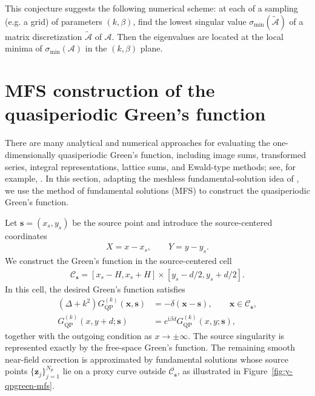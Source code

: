 \documentclass[11pt,fleqn]{article}
\newcommand{\ii}{\mathrm{i}}
\theoremstyle{definition}
\theoremstyle{remark}
\begin{document}
This conjecture suggests the following numerical scheme: at each of a sampling (e.g. a grid) of parameters $(k, \beta)$, find the lowest singular value 
$\sigma_{\min}(\tilde{\mathcal{A}})$ of a matrix discretization $\tilde{\mathcal{A}}$ of $\mathcal{A}$. Then the eigenvalues are located at the local minima of $\sigma_{\min}(\mathcal{A})$ in the $(k, \beta)$ plane.

\section{MFS construction of the quasiperiodic Green's function}
There are many analytical and numerical approaches for evaluating the one-dimensionally
quasiperiodic Green's function, including image sums, transformed series, integral
representations, lattice sums, and Ewald-type methods; see, for example,
\cite{Linton1998}. In this section, adapting the meshless fundamental-solution idea of
\cite{LuanSunZhuang2019}, we use the method of fundamental solutions (MFS) to construct
the quasiperiodic Green's function.

Let $\mathbf{s}=(x_s,y_s)$ be the source point and introduce the source-centered
coordinates
\begin{align*}
  X=x-x_s,\qquad Y=y-y_s.
\end{align*}
We construct the Green's function in the source-centered cell
\begin{align*}
  \mathcal C_{\mathbf{s}}
  =[x_s-H,x_s+H]\times[y_s-d/2,y_s+d/2].
\end{align*}
In this cell, the desired Green's function satisfies
\begin{align*}
  (\Delta+k^2)G_{\mathrm{QP}}^{(k)}(\mathbf{x},\mathbf{s})
  &=-\delta(\mathbf{x} - \mathbf{s}),
  \qquad \mathbf{x}\in\mathcal C_{\mathbf{s}},\\
  G_{\mathrm{QP}}^{(k)}(x,y+d;\mathbf{s})
  &=e^{\ii\beta d}G_{\mathrm{QP}}^{(k)}(x,y;\mathbf{s}),
\end{align*}
together with the outgoing condition as $x\to\pm\infty$.
The source singularity is represented exactly by the free-space Green's function.
The remaining smooth near-field correction is approximated by fundamental
solutions whose source points $\{\mathbf{z}_j\}_{j=1}^{N_p}$ lie on a proxy curve
outside $\overline{\mathcal C_{\mathbf{s}}}$, as illustrated in
Figure~\ref{fig:y-qpgreen-mfs}.
\end{document}
